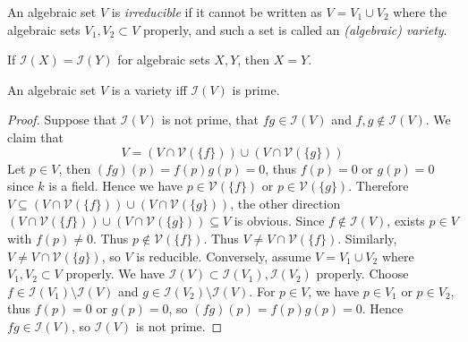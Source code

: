 \documentclass[11pt]{book}
\begin{document}
\begin{definitionbox}An algebraic set $V$ is \textit{irreducible} if it cannot be written as $V=V_1\cup V_2$ where the algebraic sets $V_1,V_2\subset V$ properly, and such a set is called an \textit{(algebraic) variety}.
\end{definitionbox}
\begin{exercise}If $\mathcal{I}(X)=\mathcal{I}(Y)$ for algebraic sets $X,Y$, then $X=Y$.
\end{exercise}
\begin{lemma}An algebraic set $V$ is a variety iff $\mathcal{I}(V)$ is prime.
\begin{proof}Suppose that $\mathcal{I}(V)$ is not prime, that $fg\in \mathcal{I}(V)$ and $f,g\not\in \mathcal{I}(V)$. We claim that 
\[V=(V\cap \mathcal{V}(\{f\}))\cup (V\cap \mathcal{V}(\{g\}))\]
Let $p\in V$, then $(fg)(p)=f(p)g(p)=0$, thus $f(p)=0$ or $g(p)=0$ since $k$ is a field. Hence we have $p\in \mathcal{V}(\{f\})$ or $p\in \mathcal{V}(\{g\})$. Therefore $V\subseteq (V\cap \mathcal{V}(\{f\}))\cup (V\cap \mathcal{V}(\{g\}))$, the other direction $(V\cap \mathcal{V}(\{f\}))\cup (V\cap \mathcal{V}(\{g\}))\subseteq V$ is obvious. Since $f\not\in \mathcal{I}(V)$, exists $p\in V$ with $f(p)\ne 0$. Thus $p\not\in \mathcal{V}(\{f\})$. Thus $V\ne V\cap \mathcal{V}(\{f\})$. Similarly, $V\ne V\cap \mathcal{V}(\{g\})$, so $V$ is reducible. Conversely, assume $V=V_1\cup V_2$ where $V_1,V_2\subset V$ properly. We have $\mathcal{I}(V)\subset \mathcal{I}(V_1),\mathcal{I}(V_2)$ properly. Choose $f\in \mathcal{I}(V_1)\setminus \mathcal{I}(V)$ and $g\in \mathcal{I}(V_2)\setminus \mathcal{I}(V)$. For $p\in V$, we have $p\in V_1$ or $p\in V_2$, thus $f(p)=0$ or $g(p)=0$, so $(fg)(p)=f(p)g(p)=0$. Hence $fg\in \mathcal{I}(V)$, so $\mathcal{I}(V)$ is not prime.
\end{proof}
\end{lemma}
\end{document}
